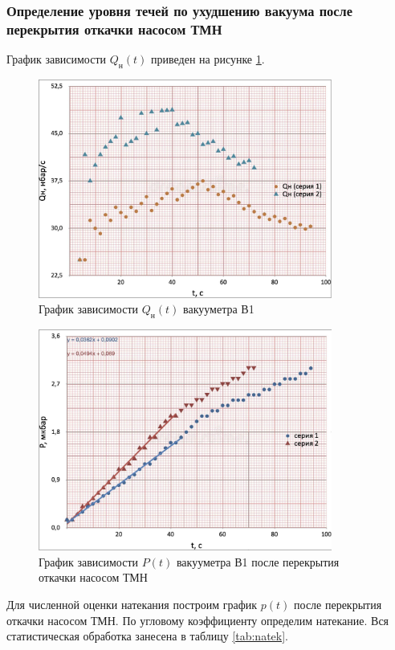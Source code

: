 \documentclass[12pt,a4paper]{article}
\begin{document}
\subsubsection*{Определение уровня течей по ухудшению вакуума после перекрытия откачки насосом ТМН}
График зависимости $Q_{\text{н}}(t)$ приведен на рисунке \ref{fig:Q(t)}. 
\begin{figure}[H]
	\caption{График зависимости $Q_{\text{н}}(t)$ вакууметра В1}
	\label{fig:Q(t)}
	\centering
	\includegraphics[width = 0.86\textwidth]{res/Q(t).pdf}
\end{figure}

\begin{figure}[H]
	\caption{График зависимости $P(t)$ вакууметра В1 после перекрытия откачки насосом ТМН}
	\label{fig:natek}
	\centering
	\includegraphics[width = 0.86\textwidth]{res/natek.pdf}
\end{figure}

Для численной оценки натекания построим график $p(t)$ после перекрытия откачки насосом ТМН.
По угловому коэффициенту определим натекание. Вся статистическая обработка занесена в таблицу \ref{tab:natek}.
\end{document}

